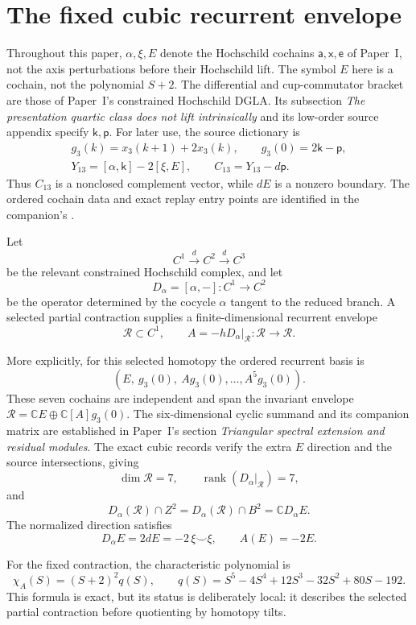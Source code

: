 \documentclass[11pt]{amsart}
\newcommand{\C}{\mathbb C}
\newcommand{\rank}{\operatorname{rank}}
\begin{document}
\section{The fixed cubic recurrent envelope}\label{sec:fixed-input}
Throughout this paper, $\alpha,\xi,E$ denote the Hochschild cochains
$\mathsf a,\mathsf x,\mathsf e$ of Paper~I, not the axis perturbations
before their Hochschild lift. The symbol $E$ here is a cochain, not the
polynomial $S+2$. The differential and cup-commutator bracket are those
of Paper~I's constrained Hochschild DGLA.
Its subsection \emph{The presentation quartic class does not lift intrinsically}
and its low-order source appendix specify $\mathsf k,\mathsf p$.
For later use, the source dictionary is
\[
\begin{gathered}
g_3(k)=x_3(k+1)+2x_3(k),\qquad g_3(0)=2\mathsf k-\mathsf p,\\
Y_{13}=[\alpha,\mathsf k]-2[\xi,E],\qquad
C_{13}=Y_{13}-d\mathsf p .
\end{gathered}
\]
Thus $C_{13}$ is a nonclosed complement vector, while $dE$ is a
nonzero boundary. The ordered cochain data and exact replay entry points
are identified in the companion's .

Let
\[
C^1\xrightarrow{d}C^2\xrightarrow{d}C^3
\]
be the relevant constrained Hochschild complex, and let
\[
D_\alpha=[\alpha,-]:C^1\longrightarrow C^2
\]
be the operator determined by the cocycle \(\alpha\) tangent to the reduced branch.  A selected partial contraction supplies a finite-dimensional recurrent envelope
\[
\mathcal R\subset C^1,
\qquad
A=-hD_\alpha\big|_{\mathcal R}:\mathcal R\longrightarrow\mathcal R.
\]

More explicitly, for this selected homotopy the ordered recurrent basis is
\[
(E,\ g_3(0),\ Ag_3(0),\ldots,A^5g_3(0)).
\]
These seven cochains are independent and span the invariant envelope
$\mathcal R=\C E\oplus\C[A]g_3(0)$. The six-dimensional cyclic summand
and its companion matrix are established in Paper~I's section
\emph{Triangular spectral extension and residual modules}.
The exact cubic records \cite{CubicRecords} verify the extra $E$ direction
and the source intersections, giving
\[
\dim\mathcal R=7,
\qquad
\rank(D_\alpha|_{\mathcal R})=7,
\]
and
\[
D_\alpha(\mathcal R)\cap Z^2
=D_\alpha(\mathcal R)\cap B^2
=\C D_\alpha E.
\]
The normalized direction satisfies
\[
D_\alpha E=2dE=-2\,\xi\smile\xi,
\qquad
A(E)=-2E.
\]

For the fixed contraction, the characteristic polynomial is
\[
\chi_A(S)=(S+2)^2q(S),
\qquad
q(S)=S^5-4S^4+12S^3-32S^2+80S-192.
\]
This formula is exact, but its status is deliberately local: it describes the selected partial contraction before quotienting by homotopy tilts.
\end{document}
